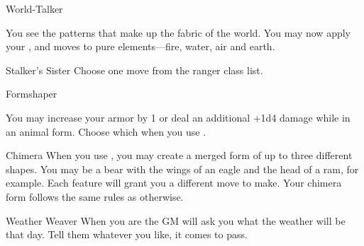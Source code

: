 \documentclass[8pt]{extarticle}
\begin{document}
\begin{multicols}{2}
\begin{amove}{World-Talker}

  You see the patterns that make up the fabric of the world. You may
  now apply your ,  and
   moves to pure elements—fire, water, air and
  earth.
\end{amove}

\begin{amove}{Stalker’s Sister}
  Choose one move from the ranger class list.
\end{amove}

\begin{amove}{Formshaper}

  You may increase your armor by 1 or deal an additional +1d4 damage
  while in an animal form. Choose which when you use
  .
\end{amove}

\begin{amove}{Chimera}
  When you use , you may create a merged form of up to
  three different shapes. You may be a bear with the wings of an eagle
  and the head of a ram, for example. Each feature will grant you a
  different move to make. Your chimera form follows the same rules as
   otherwise.
\end{amove}

\begin{amove}{Weather Weaver}
  When you are  the GM
  will ask you what the weather will be that day. Tell them whatever
  you like, it comes to pass.
\end{amove}


\vfill\null
\end{multicols}
\end{document}
